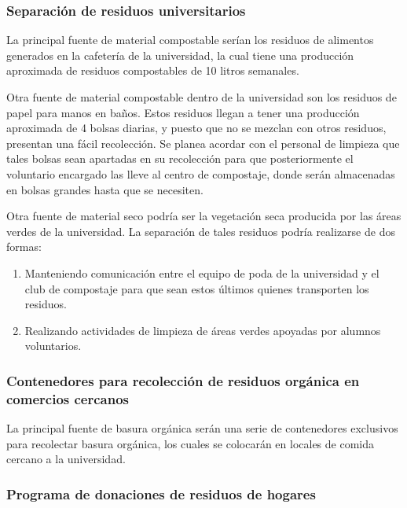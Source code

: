 \subsubsection{Separación de residuos universitarios}


La principal fuente de material compostable serían los residuos de alimentos generados en la cafetería de la universidad, la cual tiene una producción aproximada de residuos compostables de 10 litros semanales.

Otra fuente de material compostable dentro de la universidad son los residuos de papel para manos en baños. Estos residuos llegan a tener una producción aproximada de 4 bolsas diarias, y puesto que no se mezclan con otros residuos, presentan una fácil recolección. Se planea acordar con el personal de limpieza que tales bolsas sean apartadas en su recolección para que posteriormente el voluntario encargado las lleve al centro de compostaje, donde serán almacenadas en bolsas grandes hasta que se necesiten.

Otra fuente de material seco podría ser la vegetación seca producida por las áreas verdes de la universidad. La separación de tales residuos podría realizarse de dos formas:

\begin{enumerate}
    \item Manteniendo comunicación entre el equipo de poda de la universidad y el club de compostaje para que sean estos últimos quienes transporten los residuos.
    \item Realizando actividades de limpieza de áreas verdes apoyadas por alumnos voluntarios.
\end{enumerate}


\subsubsection{Contenedores para recolección de residuos orgánica en comercios cercanos}

La principal fuente de basura orgánica serán una serie de contenedores exclusivos para recolectar basura orgánica, los cuales se colocarán en locales de comida cercano a la universidad.

    
    
\subsubsection{Programa de donaciones de residuos de hogares}

